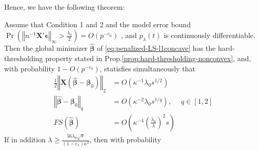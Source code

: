 \documentclass[twoside]{article}
\begin{document}
Hence, we have the following theorem:
\begin{theorem}{1}{}
    Assume that Condition 1 and 2 and the model error bound $\Pr \left( \left\Vert n^{-1}\mathbf{X}'\boldsymbol{\epsilon}  \right\Vert _{\infty} >\frac{\lambda_0}{2} \right) = O\left(p^{-c_0}\right)$ , and $p_{\lambda}(t)$ is continuously differentiable. Then the global minimizer $\hat{\boldsymbol{\beta}}$ of \ref{eq:penalized-LS-l1concave} has the hard-thresholding property stated in Prop.\ref{prop:hard-thresholding-nonconvex}, and, with probability $1-O(p^{-c_0})$, statisfies simultaneously that
    \begin{align}
        \frac{1}{2}\left\Vert \mathbf{X}\left( \hat{\boldsymbol{\beta}} -\boldsymbol{\beta}_0 \right) \right\Vert _2 &= O(\kappa^{-1}\lambda_0 s^{1/2}) \\
        \left\Vert \hat{\boldsymbol{\beta}}-\boldsymbol{\beta}_0 \right\Vert _q &= O(\kappa^{-2}\lambda_0 s^{1/q}), & q\in[1,2]\\
        FS\left(\hat{\boldsymbol{\beta}}\right) &= O\left( \kappa^{-4} \left(\frac{\lambda_0}{\lambda}\right)^2 s \right)
    \end{align}
    If in addition $\lambda \geq \frac{56\lambda_0\sqrt{s}}{(1-c_1)\kappa^2}$, then with probability 
\end{theorem}

\newpage


\end{document}
